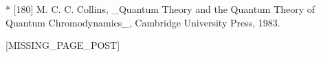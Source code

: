 * [180] M. C. C. Collins, _Quantum Theory and the Quantum Theory of Quantum Chromodynamics_, Cambridge University Press, 1983.

[MISSING_PAGE_POST]

 